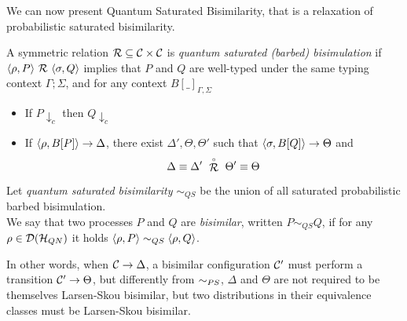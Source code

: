 We can now present Quantum Saturated Bisimilarity, that is a relaxation of probabilistic saturated bisimilarity. 

\begin{definition}
	A symmetric relation $\mathcal{R} \subseteq \mathcal{C} \times \mathcal{C}$ is \emph{quantum saturated (barbed) bisimulation} if $\langle\rho, P\rangle \ \mathcal{R}\ \langle\sigma, Q\rangle$ implies that $P$ and $Q$  are well-typed under the same typing context $\Gamma; \Sigma$, and for any context $B[\_]_{\Gamma, \Sigma}$
	\begin{itemize}
		\item If $P \downarrow_{c}$ then $Q \downarrow_{c}$
		\item If $\langle\rho, B[P]\rangle \rightarrow \Delta$, there exist $\Delta', \Theta, \Theta'$ such that $\langle\sigma, B[Q]\rangle \rightarrow \Theta$ and \[\Delta \equiv \Delta' \ \slift{\rel}\ \Theta' \equiv \Theta\]
	\end{itemize}
	Let \emph{quantum saturated bisimilarity} $\sim_{QS}$ be the union of all saturated probabilistic barbed bisimulation. \\
	We say that two {processes} $P$ and $Q$ are \emph{bisimilar}, written $P \sim_{QS} Q$, if for any $\rho \in \mathcal{D}(\mathcal{H}_{QN})$ it holds $\langle\rho, P\rangle \sim_{QS} \langle\rho, Q\rangle$.
\end{definition}

In other words, when $\mathcal{C} \rightarrow \Delta$, a bisimilar configuration $\mathcal{C}'$ must perform a transition $\mathcal{C}' \rightarrow \Theta$, but differently from $\sim_{PS}$, $\Delta$ and $\Theta$ are not required to be themselves Larsen-Skou bisimilar, but two distributions in their equivalence classes must be Larsen-Skou bisimilar.

